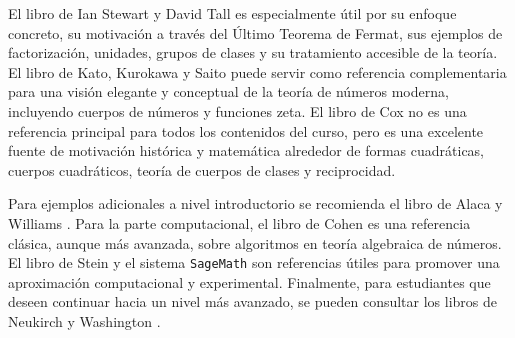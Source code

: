 \begin{refsection}
El libro de Ian Stewart y David Tall \cite{SteTal25} es especialmente útil por su enfoque concreto, su motivación a través del Último Teorema de Fermat, sus ejemplos de factorización, unidades, grupos de clases y su tratamiento accesible de la teoría. El libro de Kato, Kurokawa y Saito \cite{KKS00} puede servir como referencia complementaria para una visión elegante y conceptual de la teoría de números moderna, incluyendo cuerpos de números y funciones zeta. El libro de Cox \cite{Cox22} no es una referencia principal para todos los contenidos del curso, pero es una excelente fuente de motivación histórica y matemática alrededor de formas cuadráticas, cuerpos cuadráticos, teoría de cuerpos de clases y reciprocidad.

Para ejemplos adicionales a nivel introductorio se recomienda el libro de Alaca y Williams \cite{AW04}. Para la parte computacional, el libro de Cohen \cite{Coh93} es una referencia clásica, aunque más avanzada, sobre algoritmos en teoría algebraica de números. El libro de Stein \cite{Ste09} y el sistema \texttt{SageMath} \cite{SageMath109} son referencias útiles para promover una aproximación computacional y experimental. Finalmente, para estudiantes que deseen continuar hacia un nivel más avanzado, se pueden consultar los libros de Neukirch \cite{Neu99} y Washington \cite{Was97}.



\nocite{Jar14}
\nocite{Mar18}
\nocite{SteTal25}
\nocite{KKS00}
\nocite{Cox22}
\nocite{AW04}
\nocite{Coh93}
\nocite{Ste09}
\nocite{SageMath109}
\nocite{Neu99}
\nocite{Was97}

\printcursosbibliography
\end{refsection}

